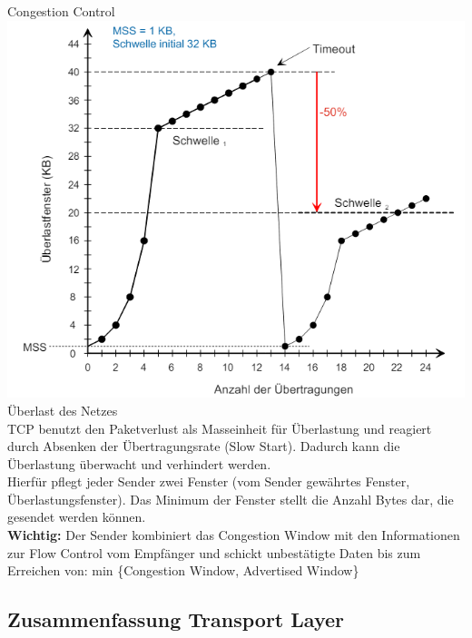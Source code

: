 \begin{concept}{Congestion Control}\\
    \includegraphics[width=0.75\linewidth]{images/congestion_control.png}\\
    Überlast des Netzes\\
    TCP benutzt den Paketverlust als Masseinheit für Überlastung und reagiert durch Absenken der Übertragungsrate (Slow Start). Dadurch kann die Überlastung überwacht und verhindert werden.\\
    Hierfür pflegt jeder Sender zwei Fenster (vom Sender gewährtes Fenster, Überlastungsfenster). Das Minimum der Fenster stellt die Anzahl Bytes dar, die gesendet werden können.\\
    \textbf{Wichtig:} Der Sender kombiniert das Congestion Window mit den Informationen zur Flow Control vom Empfänger und schickt unbestätigte Daten bis zum Erreichen von: min \{Congestion Window, Advertised Window\}
\end{concept}

\subsection{Zusammenfassung Transport Layer}

